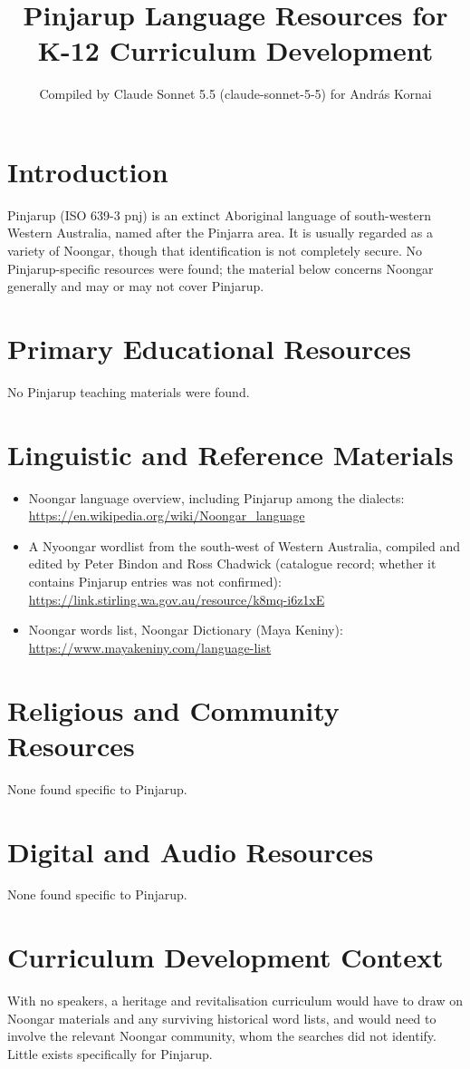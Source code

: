 \documentclass[12pt]{article}
\title{Pinjarup Language Resources for K-12 Curriculum Development}
\author{Compiled by Claude Sonnet 5.5 (claude-sonnet-5-5) for Andr\'as Kornai}
\date{}
\begin{document}
\maketitle

\section{Introduction}
Pinjarup (ISO 639-3 pnj) is an extinct Aboriginal language of south-western Western Australia, named after the Pinjarra area. It is usually regarded as a variety of Noongar, though that identification is not completely secure. No Pinjarup-specific resources were found; the material below concerns Noongar generally and may or may not cover Pinjarup.

\section{Primary Educational Resources}
No Pinjarup teaching materials were found.

\section{Linguistic and Reference Materials}
\begin{itemize}
\item Noongar language overview, including Pinjarup among the dialects: \url{https://en.wikipedia.org/wiki/Noongar_language}
\item A Nyoongar wordlist from the south-west of Western Australia, compiled and edited by Peter Bindon and Ross Chadwick (catalogue record; whether it contains Pinjarup entries was not confirmed): \url{https://link.stirling.wa.gov.au/resource/k8mq-i6z1xE}
\item Noongar words list, Noongar Dictionary (Maya Keniny): \url{https://www.mayakeniny.com/language-list}
\end{itemize}

\section{Religious and Community Resources}
None found specific to Pinjarup.

\section{Digital and Audio Resources}
None found specific to Pinjarup.

\section{Curriculum Development Context}
With no speakers, a heritage and revitalisation curriculum would have to draw on Noongar materials and any surviving historical word lists, and would need to involve the relevant Noongar community, whom the searches did not identify. Little exists specifically for Pinjarup.
\end{document}
